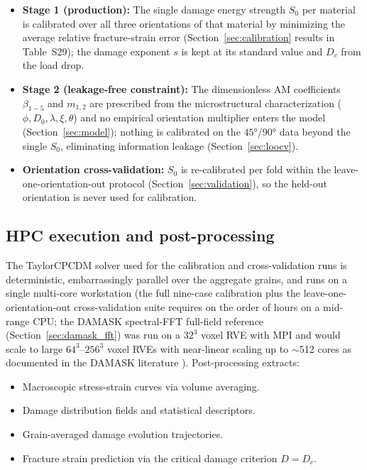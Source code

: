 \begin{itemize}
    \item \textbf{Stage 1 (production):} The single damage energy strength $S_0$ per material is calibrated over all three orientations of that material by minimizing the average relative fracture-strain error (Section~\ref{sec:calibration} results in Table~S29); the damage exponent $s$ is kept at its standard value and $D_c$ from the load drop.
    \item \textbf{Stage 2 (leakage-free constraint):} The dimensionless AM coefficients $\beta_{1-5}$ and $m_{1,2}$ are prescribed from the microstructural characterization ($\phi, D_0, \lambda, \xi, \theta$) and no empirical orientation multiplier enters the model (Section~\ref{sec:model}); nothing is calibrated on the $\ang{45}$/$\ang{90}$ data beyond the single $S_0$, eliminating information leakage (Section~\ref{sec:loocv}).
    \item \textbf{Orientation cross-validation:} $S_0$ is re-calibrated per fold within the leave-one-orientation-out protocol (Section~\ref{sec:validation}), so the held-out orientation is never used for calibration.
\end{itemize}

\subsection{HPC execution and post-processing}

The TaylorCPCDM solver used for the calibration and cross-validation runs is deterministic, embarrassingly parallel over the aggregate grains, and runs on a single multi-core workstation (the full nine-case calibration plus the leave-one-orientation-out cross-validation suite requires on the order of hours on a mid-range CPU; the DAMASK spectral-FFT full-field reference (Section~\ref{sec:damask_fft}) was run on a $32^3$ voxel RVE with MPI and would scale to large $64^3$--$256^3$ voxel RVEs with near-linear scaling up to $\sim$512 cores as documented in the DAMASK literature \cite{roters2019damask}).
Post-processing extracts:

\begin{itemize}
    \item Macroscopic stress-strain curves via volume averaging.
    \item Damage distribution fields and statistical descriptors.
    \item Grain-averaged damage evolution trajectories.
    \item Fracture strain prediction via the critical damage criterion $D = D_c$.
\end{itemize}

